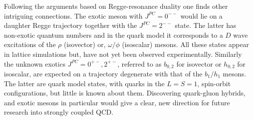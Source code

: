 Following the arguments 
 based on Regge-resonance duality one finds other intriguing connections. 
  The exotic meson with $J^{PC} = 0^{--}$ would lie on a daughter Regge trajectory together with the $J^{PC}=2^{--}$ state. The latter has non-exotic quantum numbers and in the quark model it corresponds to a $D$ wave excitations of the $\rho$ (isovector) or, $\omega/\phi$ (isoscalar) mesons. All these states appear in lattice simulations but, have not yet been observed experimentally. Similarly the unknown exotics $J^{PC}=0^{+-},2^{+-}$, referred to as $b_{0,2}$ for isovector or $h_{0,2}$ for isoscalar, are expected on a trajectory degenerate with that of the $b_1/h_1$ mesons. The latter are quark model states, with quarks in the $L=S=1$, spin-orbit configurations, but little is known about them. 
 Discovering quark-gluon hybrids, and exotic mesons in particular would give a clear, new direction for future research into strongly coupled QCD.  


